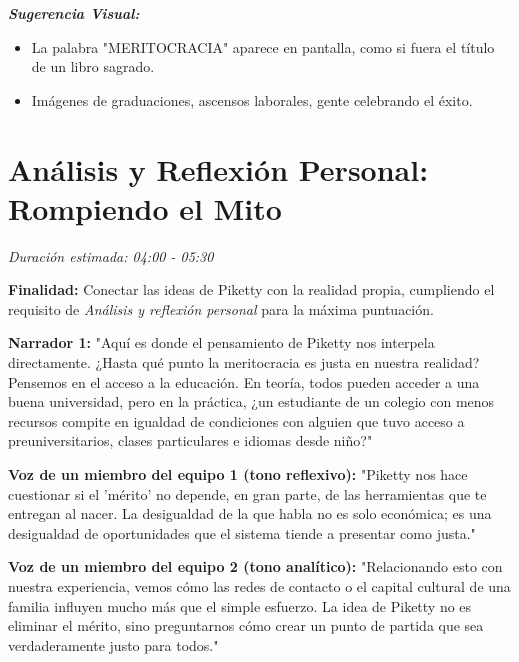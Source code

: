 \documentclass[12pt, a4paper]{article}
\begin{document}
\vspace{0.5cm}

\textit{\textbf{Sugerencia Visual:}} 
\begin{itemize}
    \item La palabra "MERITOCRACIA" aparece en pantalla, como si fuera el título de un libro sagrado.
    \item Imágenes de graduaciones, ascensos laborales, gente celebrando el éxito.
\end{itemize}

\section{Análisis y Reflexión Personal: Rompiendo el Mito}
\textit{Duración estimada: 04:00 - 05:30}

\textbf{Finalidad:} Conectar las ideas de Piketty con la realidad propia, cumpliendo el requisito de \textit{Análisis y reflexión personal} para la máxima puntuación.

\vspace{0.5cm}

\textbf{Narrador 1:}
"Aquí es donde el pensamiento de Piketty nos interpela directamente. ¿Hasta qué punto la meritocracia es justa en nuestra realidad? Pensemos en el acceso a la educación. En teoría, todos pueden acceder a una buena universidad, pero en la práctica, ¿un estudiante de un colegio con menos recursos compite en igualdad de condiciones con alguien que tuvo acceso a preuniversitarios, clases particulares e idiomas desde niño?"

\vspace{0.5cm}

\textbf{Voz de un miembro del equipo 1 (tono reflexivo):}
"Piketty nos hace cuestionar si el 'mérito' no depende, en gran parte, de las herramientas que te entregan al nacer. La desigualdad de la que habla no es solo económica; es una desigualdad de oportunidades que el sistema tiende a presentar como justa."

\vspace{0.5cm}

\textbf{Voz de un miembro del equipo 2 (tono analítico):}
"Relacionando esto con nuestra experiencia, vemos cómo las redes de contacto o el capital cultural de una familia influyen mucho más que el simple esfuerzo. La idea de Piketty no es eliminar el mérito, sino preguntarnos cómo crear un punto de partida que sea verdaderamente justo para todos."
\end{document}
